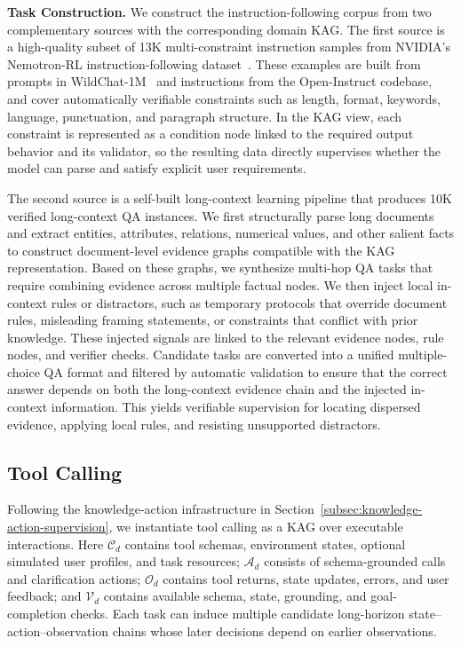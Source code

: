 \documentclass{llmxive}
\begin{document}
\textbf{Task Construction.}
We construct the instruction-following corpus from two complementary sources with the corresponding domain KAG. The first source is a high-quality subset of 13K multi-constraint instruction samples from NVIDIA's Nemotron-RL instruction-following dataset~\citep{nemo-gym}. These examples are built from prompts in WildChat-1M~\citep{zhao2024wildchat} and instructions from the Open-Instruct codebase, and cover automatically verifiable constraints such as length, format, keywords, language, punctuation, and paragraph structure. In the KAG view, each constraint is represented as a condition node linked to the required output behavior and its validator, so the resulting data directly supervises whether the model can parse and satisfy explicit user requirements.

The second source is a self-built long-context learning pipeline that produces 10K verified long-context QA instances. We first structurally parse long documents and extract entities, attributes, relations, numerical values, and other salient facts to construct document-level evidence graphs compatible with the KAG representation. Based on these graphs, we synthesize multi-hop QA tasks that require combining evidence across multiple factual nodes. We then inject local in-context rules or distractors, such as temporary protocols that override document rules, misleading framing statements, or constraints that conflict with prior knowledge. These injected signals are linked to the relevant evidence nodes, rule nodes, and verifier checks. Candidate tasks are converted into a unified multiple-choice QA format and filtered by automatic validation to ensure that the correct answer depends on both the long-context evidence chain and the injected in-context information. This yields verifiable supervision for locating dispersed evidence, applying local rules, and resisting unsupported distractors.

\subsection{Tool Calling}
\label{sec:tool-calling}

Following the knowledge-action infrastructure in Section~\ref{subsec:knowledge-action-supervision}, we instantiate tool calling as a KAG over executable interactions. Here $\mathcal{C}_d$ contains tool schemas, environment states, optional simulated user profiles, and task resources; $\mathcal{A}_d$ consists of schema-grounded calls and clarification actions; $\mathcal{O}_d$ contains tool returns, state updates, errors, and user feedback; and $\mathcal{V}_d$ contains available schema, state, grounding, and goal-completion checks. Each task can induce multiple candidate long-horizon state--action--observation chains whose later decisions depend on earlier observations.
\end{document}
